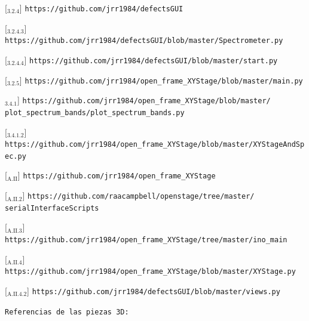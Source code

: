 [\href{https://github.com/jrr1984/defectsGUI}{\faGithub$_{3.2.4}$}] \texttt{https://github.com/jrr1984/defectsGUI}

[\href{https://github.com/jrr1984/defectsGUI/blob/master/Spectrometer.py}{\faGithub$_{3.2.4.3}$}] \texttt{https://github.com/jrr1984/defectsGUI/blob/master/Spectrometer.py}

[\href{https://github.com/jrr1984/defectsGUI/blob/master/start.py}{\faGithub$_{3.2.4.4}$}] \texttt{https://github.com/jrr1984/defectsGUI/blob/master/start.py}

[\href{https://github.com/jrr1984/open\_frame\_XYStage/blob/master/main.py}{\faGithub$_{3.2.5}$}] \texttt{https://github.com/jrr1984/open\_frame\_XYStage/blob/master/main.py}

\href{https://github.com/jrr1984/open\_frame\_XYStage/blob/master/plot\_spectrum\_bands/plot\_spectrum\_bands.py}{\faGithub$_{3.4.1}$}] \texttt{https://github.com/jrr1984/open\_frame\_XYStage/blob/master/\\\hspace{1.5cm}plot\_spectrum\_bands/plot\_spectrum\_bands.py}

[\href{https://github.com/jrr1984/open\_frame\_XYStage/blob/master/XYStageAndSpec.py}{\faGithub$_{3.4.1.2}$}] \texttt{https://github.com/jrr1984/open\_frame\_XYStage/blob/master/XYStageAndSpec.py}

[\href{https://github.com/jrr1984/open\_frame\_XYStage}{\faGithub$_{\text{A.II}}$}] \texttt{https://github.com/jrr1984/open\_frame\_XYStage}

[\href{https://github.com/raacampbell/openstage/tree/master/serialInterfaceScripts}{\faGithub$_{\text{A.II}.2}$}] \texttt{https://github.com/raacampbell/openstage/tree/master/\\\hspace{1.5cm}serialInterfaceScripts}

[\href{https://github.com/jrr1984/open\_frame\_XYStage/tree/master/ino\_main}{\faGithub$_{\text{A.II}.3}$}] \texttt{https://github.com/jrr1984/open\_frame\_XYStage/tree/master/ino\_main}

[\href{https://github.com/jrr1984/open\_frame\_XYStage/blob/master/XYStage.py}{\faGithub$_{\text{A.II}.4}$}] \texttt{https://github.com/jrr1984/open\_frame\_XYStage/blob/master/XYStage.py}

[\href{https://github.com/jrr1984/defectsGUI/blob/master/views.py}{\faGithub$_{\text{A.II}.4.2}$}] \texttt{https://github.com/jrr1984/defectsGUI/blob/master/views.py}

\texttt{Referencias de las piezas 3D:}


